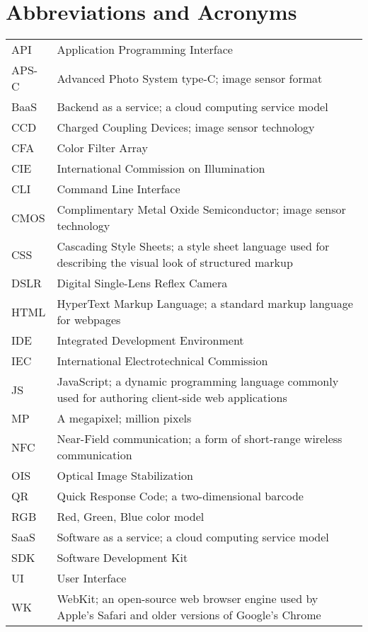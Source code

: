 \documentclass[thesis.tex]{subfiles}
\begin{document}
\chapter*{Abbreviations and Acronyms}

\noindent
\begin{longtable}{@{}p{}p{}@{}}
API & Application Programming Interface \\
APS-C & Advanced Photo System type-C; image sensor format \\
BaaS & Backend as a service; a cloud computing service model \\
CCD & Charged Coupling Devices; image sensor technology \\
CFA & Color Filter Array \\
CIE & International Commission on Illumination \\
CLI & Command Line Interface \\
CMOS & Complimentary Metal Oxide Semiconductor; image sensor technology \\
CSS & Cascading Style Sheets; a style sheet language used for describing the visual look of structured markup \\
DSLR & Digital Single-Lens Reflex Camera \\
HTML & HyperText Markup Language; a standard markup language for webpages \\
IDE & Integrated Development Environment \\
IEC & International Electrotechnical Commission \\
JS & JavaScript; a dynamic programming language commonly used for authoring client-side web applications \\
MP & A megapixel; million pixels \\
NFC & Near-Field communication; a form of short-range wireless communication \\
OIS & Optical Image Stabilization \\
QR & Quick Response Code; a two-dimensional barcode \\
RGB & Red, Green, Blue color model \\
SaaS & Software as a service; a cloud computing service model \\
SDK & Software Development Kit \\
UI & User Interface \\
WK & WebKit; an open-source web browser engine used by Apple's Safari and older versions of Google's Chrome\\

\end{longtable}
\end{document}

